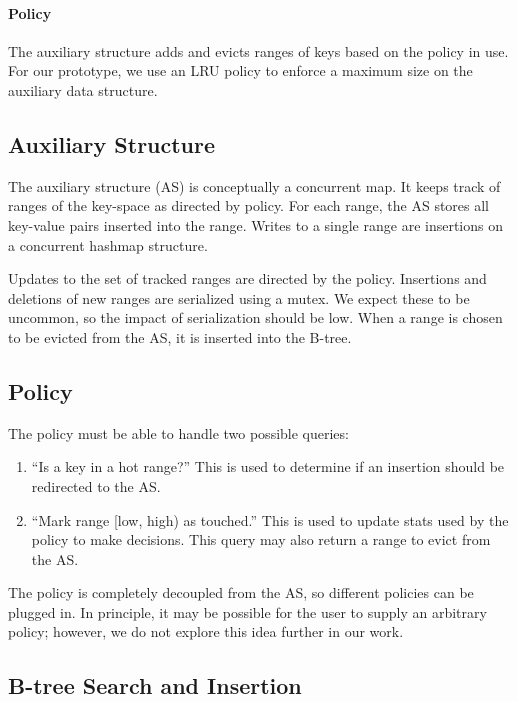 \documentclass[twocolumn]{article}
\begin{document}
\paragraph{Policy} The auxiliary structure adds and evicts ranges of keys based
on the policy in use. For our prototype, we use an LRU policy to enforce a
maximum size on the auxiliary data structure.

\subsection{Auxiliary Structure}

The auxiliary structure (AS) is conceptually a concurrent map. It keeps track
of ranges of the key-space as directed by policy. For each range, the AS stores
all key-value pairs inserted into the range. Writes to a single range are
insertions on a concurrent hashmap structure.

Updates to the set of tracked ranges are directed by the policy. Insertions and
deletions of new ranges are serialized using a mutex. We expect these to be
uncommon, so the impact of serialization should be low. When a range is chosen
to be evicted from the AS, it is inserted into the B-tree.

\subsection{Policy}

The policy must be able to handle two possible queries:

\begin{enumerate}
\item ``Is a key in a hot range?'' This is used to determine if an insertion
should be redirected to the AS.
\item ``Mark range [low, high) as touched.'' This is used to update stats used
by the policy to make decisions. This query may also return a range to evict
from the AS.
\end{enumerate}

The policy is completely decoupled from the AS, so different policies can be
plugged in. In principle, it may be possible for the user to supply an
arbitrary policy; however, we do not explore this idea further in our work.

\subsection{B-tree Search and Insertion}
\end{document}

